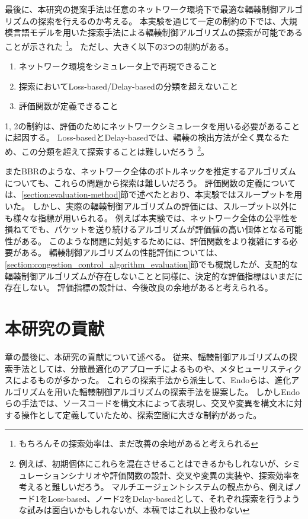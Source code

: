 \documentclass[a4paper,11pt]{jreport}
\newcommand{\secref}[1]{\ref{#1}節}
\begin{document}
最後に、本研究の提案手法は任意のネットワーク環境下で最適な輻輳制御アルゴリズムの探索を行えるのか考える。
本実験を通じて一定の制約の下では、大規模言語モデルを用いた探索手法による輻輳制御アルゴリズムの探索が可能であることが示された
\footnote{もちろんその探索効率は、まだ改善の余地があると考えられる}。
ただし、大きく以下の3つの制約がある。
\begin{enumerate}
  \item ネットワーク環境をシミュレータ上で再現できること
  \item 探索においてLoss-based/Delay-basedの分類を超えないこと
  \item 評価関数が定義できること
\end{enumerate}
1, 2の制約は、評価のためにネットワークシミュレータを用いる必要があることに起因する。
Loss-basedとDelay-basedでは、輻輳の検出方法が全く異なるため、この分類を超えて探索することは難しいだろう
\footnote{例えば、初期個体にこれらを混在させることはできるかもしれないが、シミュレーションシナリオや評価関数の設計、交叉や変異の実装や、探索効率を考えると難しいだろう。
マルチエージェントシステムの観点から、例えばノード1をLoss-based、ノード2をDelay-basedとして、それぞれ探索を行うような試みは面白いかもしれないが、本稿ではこれ以上扱わない}。

またBBRのような、ネットワーク全体のボトルネックを推定するアルゴリズムについても、これらの問題から探索は難しいだろう。
評価関数の定義については、\secref{section:evaluation-method}で述べたとおり、本実験ではスループットを用いた。
しかし、実際の輻輳制御アルゴリズムの評価には、スループット以外にも様々な指標が用いられる。
例えば本実験では、ネットワーク全体の公平性を損ねてでも、パケットを送り続けるアルゴリズムが評価値の高い個体となる可能性がある。
このような問題に対処するためには、評価関数をより複雑にする必要がある。
輻輳制御アルゴリズムの性能評価については、\secref{section:congestion_control_algorithm_evaluation}でも概説したが、支配的な輻輳制御アルゴリズムが存在しないことと同様に、決定的な評価指標はいまだに存在しない。
評価指標の設計は、今後改良の余地があると考えられる。

\section{本研究の貢献}
\label{section:contribution}

章の最後に、本研究の貢献について述べる。
従来、輻輳制御アルゴリズムの探索手法としては、分散最適化のアプローチによるものや、メタヒューリスティクスによるものが多かった。
これらの探索手法から派生して、Endoら\cite{endo-2022-toward}は、進化アルゴリズムを用いた輻輳制御アルゴリズムの探索手法を提案した。
しかしEndoらの手法では、ソースコードを構文木によって表現し、交叉や変異を構文木に対する操作として定義していたため、探索空間に大きな制約があった。
\end{document}
